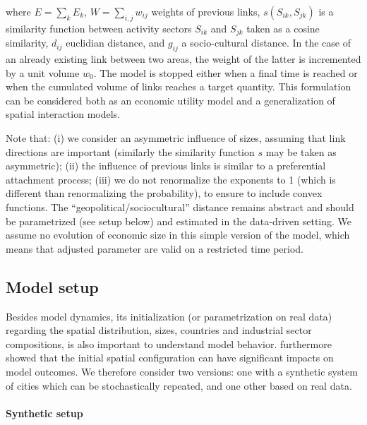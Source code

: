 \documentclass[11pt]{article}
\begin{document}
where $E  =  \sum_k E_k$, $W  = \sum_{i,j} w_{ij}$ weights of previous links, $s(S_{ik},S_{jk})$ is a similarity function between activity sectors $S_{ik}$ and $S_{jk}$ taken as a cosine similarity, $d_{ij}$ euclidian distance, and $g_{ij}$ a socio-cultural distance. In the case of an already existing link between two areas, the weight of the latter is incremented by a unit volume $w_0$. The model is stopped either when a final time is reached or when the cumulated volume of links reaches a target quantity. This formulation can be considered both as an economic utility model and a generalization of spatial interaction models.



Note that: (i) we consider an asymmetric influence of sizes, assuming that link directions are important (similarly the similarity function $s$ may be taken as asymmetric); (ii) the influence of previous links is similar to a preferential attachment process; (iii) we do not renormalize the exponents to 1 (which is different than renormalizing the probability), to ensure to include convex functions. The ``geopolitical/sociocultural'' distance remains abstract and should be parametrized (see setup below) and estimated in the data-driven setting. We assume no evolution of economic size in this simple version of the model, which means that adjusted parameter are valid on a restricted time period.


\subsection{Model setup}

Besides model dynamics, its initialization (or parametrization on real data) regarding the spatial distribution, sizes, countries and industrial sector compositions, is also important to understand model behavior. \cite{raimbault2019space} furthermore showed that the initial spatial configuration can have significant impacts on model outcomes. We therefore consider two versions: one with a synthetic system of cities which can be stochastically repeated, and one other based on real data.


\paragraph{Synthetic setup}
\end{document}
